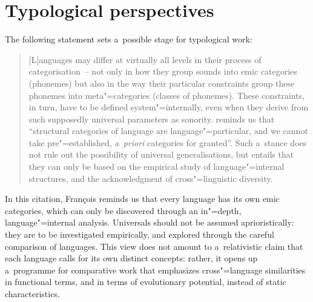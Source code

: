\chapter{Typological perspectives}
\label{chap:arealandtypologicaldiscussion}

%
%

The following statement sets a~possible stage for typological work:

\begin{quotation} [L]anguages may differ at virtually all levels in their process of categorisation~-- not only in
	how they group sounds into emic categories (phonemes) but also in the way their particular
	constraints group these phonemes into meta"=categories (classes of phonemes). These constraints, in
	turn, have to be defined system"=internally, even when they derive from such supposedly universal
	parameters as sonority. \citet[129]{haspelmath2007} reminds us that “structural categories of language
	are language"=particular, and we cannot take pre"=established, \textit{a~priori} categories for
	granted”. Such a~stance does not rule out the possibility of universal generalisations, but
	entails that they can only be based on the empirical study of language"=internal structures, and
	the acknowledgment of cross"=linguistic diversity.~\citep[429]{francois2010}
\end{quotation}

{\noindent}In this citation, François reminds us that every language has its own emic categories, which can only be discovered through an in"=depth, language"=internal analysis. Universals should not be assumed aprioristically: they are to be investigated empirically, and explored through the careful comparison of languages.​ ​This view does not amount to a~relativistic claim​ that each language calls for its own distinct concepts​: rather, it opens up a~programme for comparative work that emphasizes cross"=language similarities in functional terms, and in terms of evolutionary potential, instead of static characteristics. 


